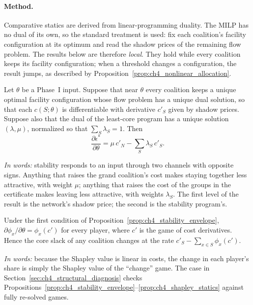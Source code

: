 \paragraph{Method.} Comparative statics are derived from linear-programming duality. The MILP has no dual of its own, so the standard treatment is used: fix each coalition's facility configuration at its optimum and read the shadow prices of the remaining flow problem. The results below are therefore \emph{local}. They hold while every coalition keeps its facility configuration; when a threshold changes a configuration, the result jumps, as described by Proposition~\ref{prop:ch4_nonlinear_allocation}.

\begin{proposition}
\label{prop:ch4_stability_envelope}
Let $\theta$ be a Phase~I input. Suppose that near $\theta$ every coalition keeps a unique optimal facility configuration whose flow problem has a unique dual solution, so that each $c(S;\theta)$ is differentiable with derivative $c'_S$ given by shadow prices. Suppose also that the dual of the least-core program has a unique solution $(\lambda,\mu)$, normalized so that $\sum_S\lambda_S=1$. Then
\begin{equation}
\label{eq:ch4_stability_envelope}
\frac{\partial\epsilon^*}{\partial\theta}
=\mu\,c'_N-\sum_{S}\lambda_S\,c'_S .
\end{equation}
\end{proposition}

\emph{In words:} stability responds to an input through two channels with opposite signs. Anything that raises the grand coalition's cost makes staying together less attractive, with weight $\mu$; anything that raises the cost of the groups in the certificate makes leaving less attractive, with weights $\lambda_S$. The first level of the result is the network's shadow price; the second is the stability program's.

\begin{proposition}
\label{prop:ch4_shapley_statics}
Under the first condition of Proposition~\ref{prop:ch4_stability_envelope}, $\partial\phi_x/\partial\theta=\phi_x(c')$ for every player, where $c'$ is the game of cost derivatives. Hence the core slack of any coalition changes at the rate $c'_S-\sum_{x\in S}\phi_x(c')$.
\end{proposition}

\emph{In words:} because the Shapley value is linear in costs, the change in each player's share is simply the Shapley value of the ``change'' game. The case in Section~\ref{sec:ch4_structural_diagnosis} checks Propositions~\ref{prop:ch4_stability_envelope}--\ref{prop:ch4_shapley_statics} against fully re-solved games.


